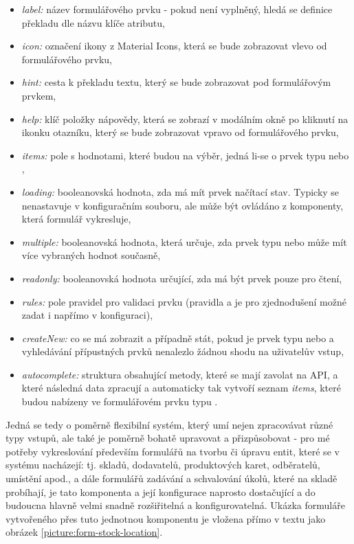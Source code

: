 \begin{itemize}
    \item \emph{label:} název formulářového prvku - pokud není vyplněný, hledá se definice překladu dle názvu klíče atributu,
    \item \emph{icon:} označení ikony z Material Icons, která se bude zobrazovat vlevo od formulářového prvku,
    \item \emph{hint:} cesta k překladu textu, který se bude zobrazovat pod formulářovým prvkem,
    \item \emph{help:} klíč položky nápovědy, která se zobrazí v modálním okně po kliknutí na ikonku otazníku, který se bude zobrazovat vpravo od formulářového prvku,
    \item \emph{items:} pole s hodnotami, které budou na výběr, jedná li-se o prvek typu  nebo ,
    \item \emph{loading:} booleanovská hodnota, zda má mít prvek načítací stav. Typicky se nenastavuje v konfiguračním souboru, ale může být ovládáno z komponenty, která formulář vykresluje,
    \item \emph{multiple:} booleanovská hodnota, která určuje, zda prvek typu  nebo  může mít více vybraných hodnot současně,
    \item \emph{readonly:} booleanovská hodnota určující, zda má být prvek pouze pro čtení,
    \item \emph{rules:} pole pravidel pro validaci prvku (pravidla  a  je pro zjednodušení možné zadat i napřímo v konfiguraci),
    \item \emph{createNew:} co se má zobrazit a případně stát, pokud je prvek typu  nebo  a vyhledávání přípustných prvků nenalezlo žádnou shodu na uživatelův vstup,
    \item \emph{autocomplete:} struktura obsahující metody, které se mají zavolat na API, a které následná data zpracují a automaticky tak vytvoří seznam \emph{items}, které budou nabízeny ve formulářovém prvku typu .
\end{itemize}

Jedná se tedy o poměrně flexibilní systém, který umí nejen zpracovávat různé typy vstupů, ale také je poměrně bohatě upravovat a přizpůsobovat - pro mé potřeby vykreslování především formulářů na tvorbu či úpravu entit, které se v systému nacházejí: tj. skladů, dodavatelů, produktových karet, odběratelů, umístění apod., a dále formulářů zadávání a schvalování úkolů, které na skladě probíhají, je tato komponenta a její konfigurace naprosto dostačující a do budoucna hlavně velmi snadně rozšiřitelná a konfigurovatelná. Ukázka formuláře vytvořeného přes tuto jednotnou komponentu je vložena přímo v textu jako obrázek \ref{picture:form-stock-location}.

